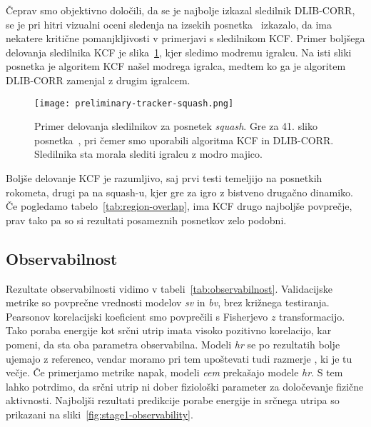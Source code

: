 Čeprav smo objektivno določili, da se je najbolje izkazal sledilnik DLIB-CORR, se je pri hitri vizualni oceni sledenja na izsekih posnetka~\cite{squashtv2014squash} izkazalo, da ima nekatere kritične pomanjkljivosti v primerjavi s sledilnikom KCF. Primer boljšega delovanja sledilnika KCF je slika~\ref{fig:squash-tracker-visual}, kjer sledimo modremu igralcu. Na isti sliki posnetka je algoritem KCF našel modrega igralca, medtem ko ga je algoritem DLIB-CORR zamenjal z drugim igralcem. 



\begin{figure}[!htbp]
	\centering
	\texttt{[image: preliminary-tracker-squash.png]}
	\caption[Primer delovanja sledilnikov za posnetek \textit{squash}]{Primer delovanja sledilnikov za posnetek \textit{squash}. Gre za 41. sliko posnetka~\cite{squashtv2014squash}, pri čemer smo uporabili algoritma KCF in DLIB-CORR. Sledilnika sta morala slediti igralcu z modro majico.}
	\label{fig:squash-tracker-visual}
\end{figure}


Boljše delovanje KCF je razumljivo, saj prvi testi temeljijo na posnetkih rokometa, drugi pa na squash-u, kjer gre za igro z bistveno drugačno dinamiko. Če pogledamo tabelo~\ref{tab:region-overlap}, ima KCF drugo najboljše povprečje, prav tako pa so si rezultati posameznih posnetkov zelo podobni. 


















\subsection{Observabilnost}
Rezultate observabilnosti vidimo v tabeli~\ref{tab:observabilnost}. Validacijske metrike so povprečne vrednosti modelov \textit{sv} in \textit{bv}, brez križnega testiranja.  Pearsonov korelacijski koeficient smo povprečili s Fisherjevo $z$ transformacijo. Tako poraba energije kot srčni utrip imata visoko pozitivno korelacijo, kar pomeni, da sta oba parametra observabilna. Modeli \textit{hr} se po rezultatih \corr bolje ujemajo z referenco, vendar moramo pri tem upoštevati tudi razmerje \nsv, ki je tu večje. Če primerjamo metrike napak, modeli \textit{eem} prekašajo modele \textit{hr}. S tem lahko potrdimo, da srčni utrip ni dober fiziološki parameter za določevanje fizične aktivnosti. Najboljši rezultati predikcije porabe energije in srčnega utripa so prikazani na sliki~\ref{fig:stage1-observability}.

